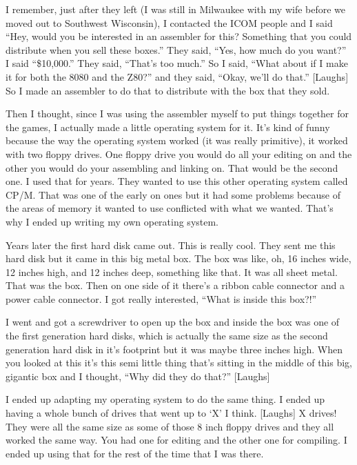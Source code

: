 I remember, just after they left (I was still in Milwaukee with my wife before we moved out to Southwest Wisconsin), I contacted the ICOM people and I said “Hey, would you be interested in an assembler for this? Something that you could distribute when you sell these boxes.” They said, “Yes, how much do you want?” I said “\$10,000.” They said, “That’s too much.” So I said, “What about if I make it for both the 8080 and the Z80?” and they said, “Okay, we’ll do that.” [Laughs] So I made an assembler to do that to distribute with the box that they sold.

Then I thought, since I was using the assembler myself to put things together for the games, I actually made a little operating system for it. It’s kind of funny because the way the operating system worked (it was really primitive), it worked with two floppy drives. One floppy drive you would do all your editing on and the other you would do your assembling and linking on. That would be the second one. I used that for years. They wanted to use this other operating system called CP/M. That was one of the early on ones but it had some problems because of the areas of memory it wanted to use conflicted with what we wanted. That’s why I ended up writing my own operating system.

Years later the first hard disk came out. This is really cool. They sent me this hard disk but it came in this big metal box. The box was like, oh, 16 inches wide, 12 inches high, and 12 inches deep, something like that. It was all sheet metal. That was the box. Then on one side of it there’s a ribbon cable connector and a power cable connector. I got really interested, “What is inside this box?!” 

I went and got a screwdriver to open up the box and inside the box was one of the first generation hard disks, which is actually the same size as the second generation hard disk in it’s footprint but it was maybe three inches high. When you looked at this it’s this semi little thing that’s sitting in the middle of this big, gigantic box and I thought, “Why did they do that?” [Laughs]

I ended up adapting my operating system to do the same thing. I ended up having a whole bunch of drives that went up to ‘X’ I think. [Laughs] X drives! They were all the same size as some of those 8 inch floppy drives and they all worked the same way. You had one for editing and the other one for compiling. I ended up using that for the rest of the time that I was there.

